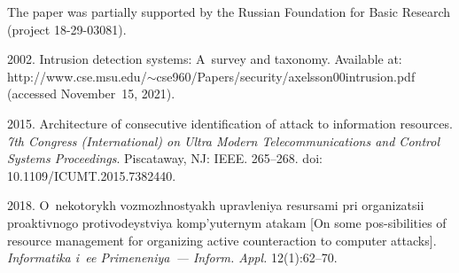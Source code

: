 



\vspace*{-12pt}

\Ack
\noindent
The paper was partially supported by the Russian Foundation for Basic Research 
(project 18-29-03081).



  \begin{multicols}{2}

\renewcommand{\bibname}{\protect\rmfamily References}

{\small\frenchspacing
 {%
 \begin{thebibliography}{99}
 2002. Intrusion detection systems: A~survey and taxonomy. Available at: {\sf 
http://www.cse.msu.\linebreak edu/$\sim$cse960/Papers/security/axelsson00intrusion.pdf} (accessed 
November~15, 2021).

 2015. Architecture of 
consecutive identification of attack to information resources. \textit{7th Congress (International) on 
Ultra Modern Telecommunications and Control Systems Proceedings}. Piscataway, NJ: IEEE.  
265--268. doi: 10.1109/ICUMT.2015.7382440. 

 2018. 
O~nekotorykh vozmozhnostyakh upravleniya resursami pri organizatsii proaktivnogo protivodeystviya 
komp'yuternym atakam [On some pos-sibilities of resource management for organizing active 
counteraction to computer attacks]. \textit{Informatika i~ee Primeneniya~--- Inform. Appl.} 
 12(1):62--70.
 

\end{thebibliography}}}
\end{multicols}
